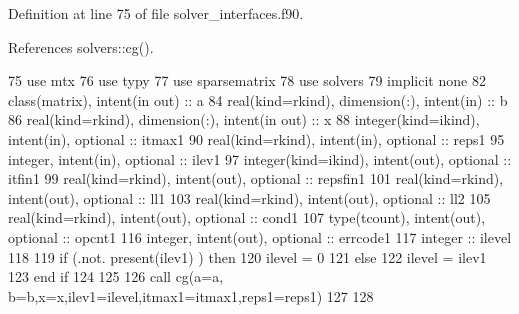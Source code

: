Definition at line 75 of file solver\+\_\+interfaces.\+f90.



References solvers\+::cg().


\begin{DoxyCode}
75         \textcolor{keywordtype}{use }mtx
76         \textcolor{keywordtype}{use }typy
77         \textcolor{keywordtype}{use }sparsematrix
78         \textcolor{keywordtype}{use }solvers
79         \textcolor{keywordtype}{implicit none}
82         \textcolor{keywordtype}{class}(matrix), \textcolor{keywordtype}{intent(in out)} :: a
84         \textcolor{keywordtype}{real(kind=rkind)}, \textcolor{keywordtype}{dimension(:)}, \textcolor{keywordtype}{intent(in)} :: b
86         \textcolor{keywordtype}{real(kind=rkind)}, \textcolor{keywordtype}{dimension(:)}, \textcolor{keywordtype}{intent(in out)} :: x
88         \textcolor{keywordtype}{integer(kind=ikind)}, \textcolor{keywordtype}{intent(in)}, \textcolor{keywordtype}{optional} :: itmax1
90         \textcolor{keywordtype}{real(kind=rkind)}, \textcolor{keywordtype}{intent(in)}, \textcolor{keywordtype}{optional} :: reps1
95         \textcolor{keywordtype}{integer}, \textcolor{keywordtype}{intent(in)}, \textcolor{keywordtype}{optional} :: ilev1
97         \textcolor{keywordtype}{integer(kind=ikind)}, \textcolor{keywordtype}{intent(out)}, \textcolor{keywordtype}{optional} :: itfin1
99         \textcolor{keywordtype}{real(kind=rkind)}, \textcolor{keywordtype}{intent(out)}, \textcolor{keywordtype}{optional} :: repsfin1
101         \textcolor{keywordtype}{real(kind=rkind)}, \textcolor{keywordtype}{intent(out)}, \textcolor{keywordtype}{optional} :: ll1
103         \textcolor{keywordtype}{real(kind=rkind)}, \textcolor{keywordtype}{intent(out)}, \textcolor{keywordtype}{optional} :: ll2
105         \textcolor{keywordtype}{real(kind=rkind)}, \textcolor{keywordtype}{intent(out)}, \textcolor{keywordtype}{optional} :: cond1
107         \textcolor{keywordtype}{type}(tcount), \textcolor{keywordtype}{intent(out)}, \textcolor{keywordtype}{optional} :: opcnt1
116         \textcolor{keywordtype}{integer}, \textcolor{keywordtype}{intent(out)}, \textcolor{keywordtype}{optional} :: errcode1
117         \textcolor{keywordtype}{integer} :: ilevel
118 
119         \textcolor{keywordflow}{if} (.not. \textcolor{keyword}{present}(ilev1) ) \textcolor{keywordflow}{then}
120           ilevel = 0
121         \textcolor{keywordflow}{else}
122           ilevel = ilev1
123 \textcolor{keywordflow}{        end if}
124 
125 
126         \textcolor{keyword}{call }cg(a=a, b=b,x=x,ilev1=ilevel,itmax1=itmax1,reps1=reps1)
127 
128 
\end{DoxyCode}


